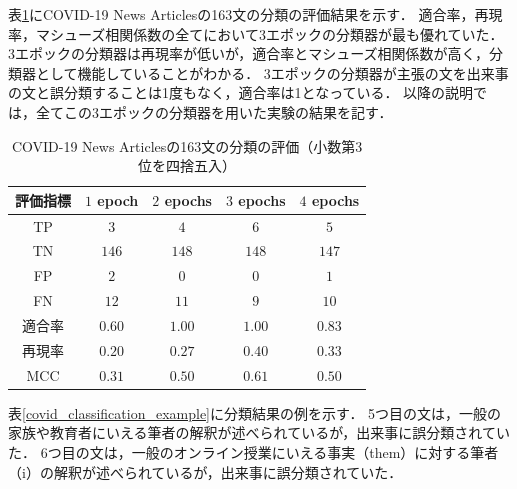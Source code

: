 \documentclass[12pt,a4j]{jreport}
\begin{document}
表\ref{covid_classification_evaluation}にCOVID-19 News Articlesの163文の分類の評価結果を示す．
適合率，再現率，マシューズ相関係数の全てにおいて3エポックの分類器が最も優れていた．
3エポックの分類器は再現率が低いが，適合率とマシューズ相関係数が高く，分類器として機能していることがわかる．
3エポックの分類器が主張の文を出来事の文と誤分類することは1度もなく，適合率は1となっている．
以降の説明では，全てこの3エポックの分類器を用いた実験の結果を記す．

\begin{table}[H]
  \caption{
    COVID-19 News Articlesの163文の分類の評価（小数第3位を四捨五入）
  }
  \centering
  \vspace{4mm}
    \begin{tabular}{ccccc}
    \hline
    評価指標 & $1$ epoch & $2$ epochs & $3$ epochs & $4$ epochs
    \\
    \hline
    TP & $3$ & $4$ & $6$ & $5$
    \\
    TN & $146$ & $148$ & $148$ & $147$
    \\
    FP & $2$ & $0$ & $0$ & $1$
    \\
    FN & $12$ & $11$ & $9$ & $10$
    \\
    適合率 & $0.60$ & $\mathbf{1.00}$ & $\mathbf{1.00}$ & $0.83$
    \\
    再現率 & $0.20$ & $0.27$ & $\mathbf{0.40}$ & $0.33$
    \\
    MCC & $0.31$ & $0.50$ & $\mathbf{0.61}$ & $0.50$
    \\
    \hline
    \end{tabular}
  \label{covid_classification_evaluation}
\end{table}

表\ref{covid_classification_example}に分類結果の例を示す．
5つ目の文は，一般の家族や教育者にいえる筆者の解釈が述べられているが，出来事に誤分類されていた．
6つ目の文は，一般のオンライン授業にいえる事実（them）に対する筆者（i）の解釈が述べられているが，出来事に誤分類されていた．
\end{document}
